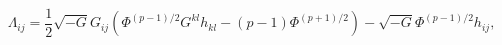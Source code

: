 \begin{equation}
{\Lambda}_{ij}=\frac{1}{2}\sqrt{-G}G_{ij}\left({\Phi}^{(p-1)/2}G^{kl}h_{kl}
-(p-1){\Phi}^{(p+1)/2}\right)-\sqrt{-G}{\Phi}^{(p-1)/2}h_{ij},
\end{equation}


